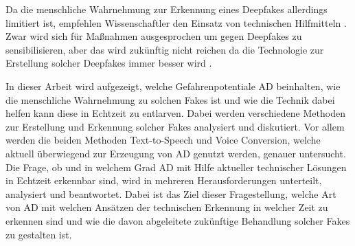 Da die menschliche Wahrnehmung zur Erkennung eines Deepfakes allerdings limitiert ist, empfehlen Wissenschaftler den Einsatz von technischen Hilfmitteln \citep[][]{Mueller2022}.
Zwar wird sich für Maßnahmen ausgesprochen um gegen Deepfakes zu sensibilisieren, aber das wird zukünftig nicht reichen da die Technologie zur Erstellung solcher Deepfakes immer besser wird \citep[][]{Amezaga2022}.
\par
In dieser Arbeit wird aufgezeigt, welche Gefahrenpotentiale AD beinhalten, wie die menschliche Wahrnehmung zu solchen Fakes ist und wie die Technik dabei helfen kann diese in Echtzeit zu entlarven.
Dabei werden verschiedene Methoden zur Erstellung und Erkennung solcher Fakes analysiert und diskutiert.
Vor allem werden die beiden Methoden Text-to-Speech und Voice Conversion, welche aktuell überwiegend zur Erzeugung von AD genutzt werden, genauer untersucht.
Die Frage, ob und in welchem Grad AD mit Hilfe aktueller technischer Lösungen in Echtzeit erkennbar sind, wird in mehreren Herausforderungen unterteilt, analysiert und beantwortet.
Dabei ist das Ziel dieser Fragestellung, welche Art von AD mit welchen Ansätzen der technischen Erkennung in welcher Zeit zu erkennen sind und wie die davon abgeleitete zukünftige Behandlung solcher Fakes zu gestalten ist. 
